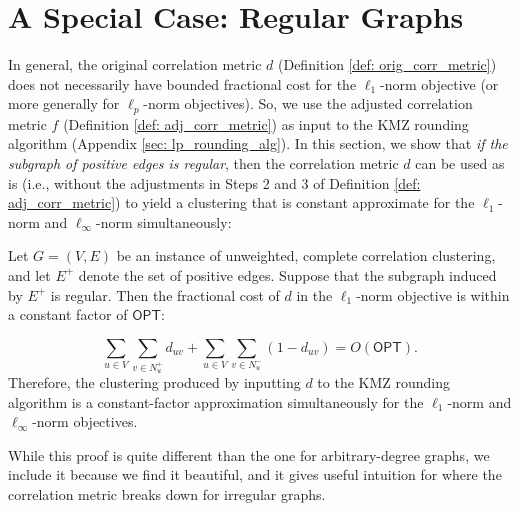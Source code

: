 \section{A Special Case: Regular Graphs} \label{sec: regular_warmup}
In general, the original correlation metric $d$ (Definition \ref{def: orig_corr_metric}) does not necessarily have bounded fractional cost for the $\ell_1$-norm objective (or more generally for $\ell_p$-norm objectives). So, we use the adjusted correlation metric $f$ (Definition \ref{def: adj_corr_metric}) as input to the KMZ rounding algorithm (Appendix \ref{sec: lp_rounding_alg}). In this section, we show that \textit{if the subgraph of positive edges is regular}, then the correlation metric $d$ can be used as is (i.e., without the adjustments in Steps 2 and 3 of Definition \ref{def: adj_corr_metric}) to yield a clustering that is constant approximate for the $\ell_1$-norm and $\ell_{\infty}$-norm simultaneously:

\begin{theorem}
    Let $G=(V,E)$ be an instance of unweighted, complete correlation clustering, and let $E^+$ denote the set of positive edges. Suppose that the subgraph induced by $E^+$ is regular. Then the fractional cost of $d$ in the $\ell_1$-norm objective is within a constant factor of $\textsf{OPT}$:

    \[\sum_{u \in V} \sum_{v \in N_u^+} d_{uv} + \sum_{u \in V} \sum_{v \in N_u^-} (1-d_{uv}) = O(\textsf{OPT}).\]
    Therefore, the clustering produced by inputting $d$ to the KMZ rounding algorithm is a constant-factor approximation simultaneously for the $\ell_1$-norm and $\ell_{\infty}$-norm objectives. 
\end{theorem}

While this proof is quite different than the one for arbitrary-degree graphs,
we include it because we find it beautiful,
and it gives useful intuition for where the correlation metric breaks down for irregular graphs.


